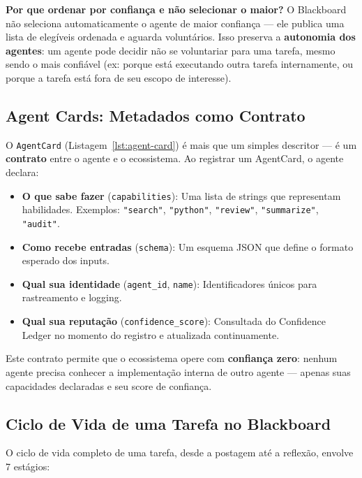 \textbf{Por que ordenar por confiança e não selecionar o maior?} O Blackboard não seleciona automaticamente o agente de maior confiança — ele publica uma lista de elegíveis ordenada e aguarda voluntários. Isso preserva a \textbf{autonomia dos agentes}: um agente pode decidir não se voluntariar para uma tarefa, mesmo sendo o mais confiável (ex: porque está executando outra tarefa internamente, ou porque a tarefa está fora de seu escopo de interesse).

\subsection{Agent Cards: Metadados como Contrato}

O \texttt{AgentCard} (Listagem~\ref{lst:agent-card}) é mais que um simples descritor — é um \textbf{contrato} entre o agente e o ecossistema. Ao registrar um AgentCard, o agente declara:

\begin{itemize}
    \item \textbf{O que sabe fazer} (\texttt{capabilities}): Uma lista de strings que representam habilidades. Exemplos: \texttt{"search"}, \texttt{"python"}, \texttt{"review"}, \texttt{"summarize"}, \texttt{"audit"}.
    \item \textbf{Como recebe entradas} (\texttt{schema}): Um esquema JSON que define o formato esperado dos inputs.
    \item \textbf{Qual sua identidade} (\texttt{agent\_id}, \texttt{name}): Identificadores únicos para rastreamento e logging.
    \item \textbf{Qual sua reputação} (\texttt{confidence\_score}): Consultada do Confidence Ledger no momento do registro e atualizada continuamente.
\end{itemize}

Este contrato permite que o ecossistema opere com \textbf{confiança zero}: nenhum agente precisa conhecer a implementação interna de outro agente — apenas suas capacidades declaradas e seu score de confiança.

\subsection{Ciclo de Vida de uma Tarefa no Blackboard}

O ciclo de vida completo de uma tarefa, desde a postagem até a reflexão, envolve 7 estágios:

